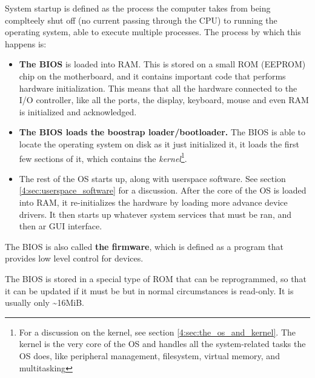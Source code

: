 \documentclass[../main.tex]{subfiles}
\begin{document}
System startup is defined as the process the computer takes from being complteely shut off (no current passing through the CPU) to running the operating system, able to execute multiple processes. The process by which this happens is:

\begin{itemize}
    \item \textbf{The BIOS} is loaded into RAM. This is stored on a small ROM (EEPROM) chip on the motherboard, and it contains important code that performs hardware initialization. This means that all the hardware connected to the I/O controller, like all the ports, the display, keyboard, mouse and even RAM is initialized and acknowledged.
    \item \textbf{The BIOS loads the boostrap loader/bootloader.} The BIOS is able to locate the operating system on disk as it just initialized it, it loads the first few sections of it, which contains the \emph{kernel}\footnote{For a discussion on the kernel, see section \ref{4:sec:the_os_and_kernel}. The kernel is the very core of the OS and handles all the system-related tasks the OS does, like peripheral management, filesystem, virtual memory, and multitasking}.
    \item The rest of the OS starts up, along with userspace software. See section \ref{4:sec:userspace_software} for a discussion. After the core of the OS is loaded into RAM, it re-initializes the hardware by loading more advance device drivers. It then starts up whatever system services that must be ran, and then ar GUI interface.
\end{itemize}

The BIOS is also called \textbf{the firmware}, which is defined as a program that provides low level control for devices.

The BIOS is stored in a special type of ROM that can be reprogrammed, so that it can be updated if it must be but in normal circumstances is read-only. It is usually only \textasciitilde16MiB.
\end{document}
